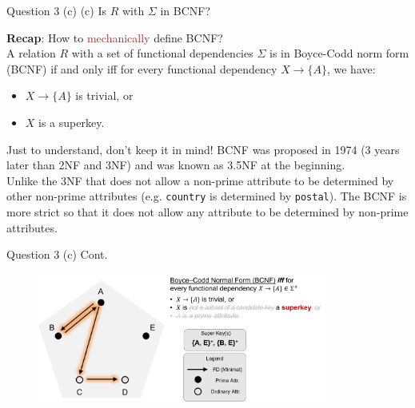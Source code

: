 \begin{frame}[fragile]{Question 3 (c)}
(c) Is $R$ with $\Sigma$ in BCNF?\\\vspace{10pt}

\textbf{Recap}: How to \textcolor{brown}{mechanically} define BCNF?\\\vspace{10pt}
A relation $R$ with a set of functional dependencies $\Sigma$ is in Boyce-Codd norm form (BCNF) if and only iff for every functional dependency $X\rightarrow\{A\}$, we have:
\begin{itemize}
	\item $X\rightarrow\{A\}$ is trivial, or
	\item $X$ is a superkey.
\end{itemize}\vspace{3pt}

\begin{alertblock}{Just to understand, don't keep it in mind!}
BCNF was proposed in 1974 (3 years later than 2NF and 3NF) and was known as 3.5NF at the beginning.\\\vspace{3pt}
Unlike the 3NF that does not allow a non-prime attribute to be determined by other non-prime attributes (e.g. \texttt{country} is determined by \texttt{postal}). 
The BCNF is more strict so that it does not allow any attribute to be determined by non-prime attributes.
\end{alertblock}

\end{frame}

\begin{frame}[fragile]{Question 3 (c) Cont.}
\begin{figure}
	\includegraphics[width=0.85\textwidth, trim=0 0 0 0, clip]{t5/images/q3_bcnf_highlight.png}
\end{figure}
\end{frame}

